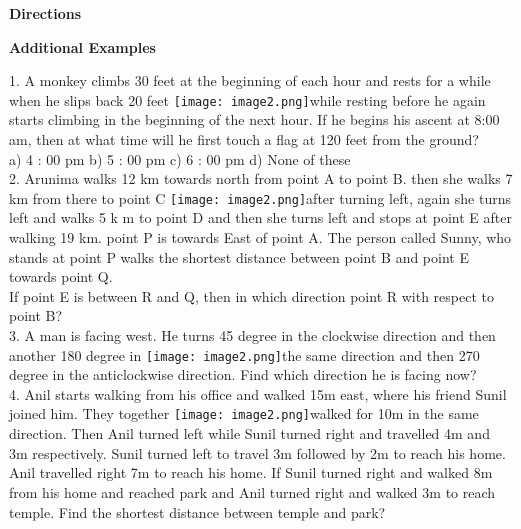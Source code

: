 \documentclass[
]{article}
\author{}
\date{}
\begin{document}
	
 

\begin{center}
	{\Large \textbf{Directions \\}}
\end{center}

{\large \textbf{Additional Examples  \\}}

1. A monkey climbs 30 feet at the beginning of each hour and rests for a while when he slips
back 20 feet \texttt{[image: image2.png]}while resting before he again starts climbing in the beginning of the next hour.
If he begins his ascent at 8:00 am, then at what time will he first touch a flag at 120 feet from
the ground?\\
a) 4 : 00 pm \hspace{2mm}b) 5 : 00 pm \hspace{2mm}c) 6 : 00 pm \hspace{2mm}d) None of these\\

2. Arunima walks 12 km towards north from point A to point B. then she walks 7 km from
there to point C \texttt{[image: image2.png]}after turning left, again she turns left and walks 5 k m to point D and then
she turns left and stops at point E after walking 19 km. point P is towards East of point A.
The person called Sunny, who stands at point P walks the shortest distance between point B
and point E towards point Q.\\
If point E is between R and Q, then in which direction point R with respect to point B?\\

3. A man is facing west. He turns 45 degree in the clockwise direction and then another 180
degree in \texttt{[image: image2.png]}the same direction and then 270 degree in the anticlockwise direction. Find which
direction he is facing now?\\

4. Anil starts walking from his office and walked 15m east, where his friend Sunil joined him.
They together \texttt{[image: image2.png]}walked for 10m in the same direction. Then Anil turned left while Sunil
turned right and travelled 4m and 3m respectively. Sunil turned left to travel 3m followed
by 2m to reach his home. Anil travelled right 7m to reach his home. If Sunil turned right and
walked 8m from his home and reached park and Anil turned right and walked 3m to reach
temple. Find the shortest distance between temple and park?\\
\end{document}

